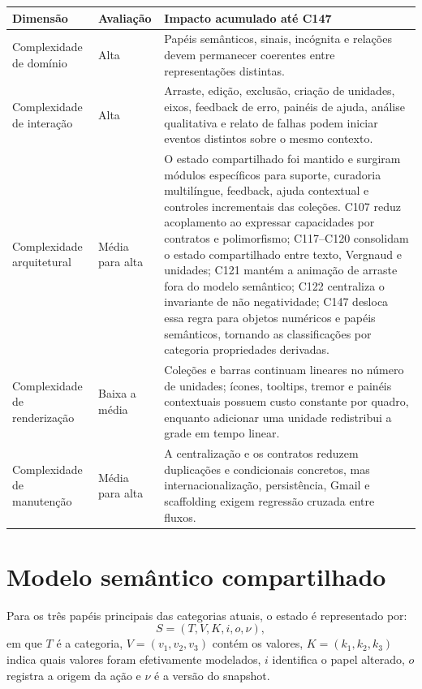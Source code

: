 \documentclass[12pt,a4paper]{article}
\begin{document}
\begin{tabularx}{\textwidth}{p{3.8cm}p{2.8cm}X}
\toprule
\textbf{Dimensão} & \textbf{Avaliação} & \textbf{Impacto acumulado até C147}\\
\midrule
Complexidade de domínio & Alta & Papéis semânticos, sinais, incógnita e relações devem permanecer coerentes entre representações distintas.\\
Complexidade de interação & Alta & Arraste, edição, exclusão, criação de unidades, eixos, feedback de erro, painéis de ajuda, análise qualitativa e relato de falhas podem iniciar eventos distintos sobre o mesmo contexto.\\
Complexidade arquitetural & Média para alta & O estado compartilhado foi mantido e surgiram módulos específicos para suporte, curadoria multilíngue, feedback, ajuda contextual e controles incrementais das coleções. C107 reduz acoplamento ao expressar capacidades por contratos e polimorfismo; C117--C120 consolidam o estado compartilhado entre texto, Vergnaud e unidades; C121 mantém a animação de arraste fora do modelo semântico; C122 centraliza o invariante de não negatividade; C147 desloca essa regra para objetos numéricos e papéis semânticos, tornando as classificações por categoria propriedades derivadas.\\
Complexidade de renderização & Baixa a média & Coleções e barras continuam lineares no número de unidades; ícones, tooltips, tremor e painéis contextuais possuem custo constante por quadro, enquanto adicionar uma unidade redistribui a grade em tempo linear.\\
Complexidade de manutenção & Média para alta & A centralização e os contratos reduzem duplicações e condicionais concretos, mas internacionalização, persistência, Gmail e scaffolding exigem regressão cruzada entre fluxos.\\
\bottomrule
\end{tabularx}

\section{Modelo semântico compartilhado}

Para os três papéis principais das categorias atuais, o estado é representado por:
\[
S = (T, V, K, i, o, \nu),
\]
em que $T$ é a categoria, $V=(v_1,v_2,v_3)$ contém os valores, $K=(k_1,k_2,k_3)$ indica quais valores foram efetivamente modelados, $i$ identifica o papel alterado, $o$ registra a origem da ação e $\nu$ é a versão do snapshot.
\end{document}
